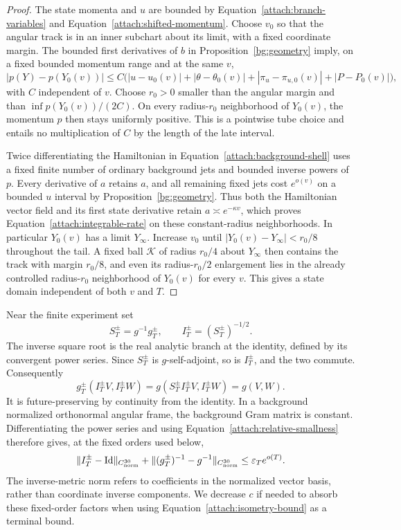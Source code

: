 \begin{proof}
The state momenta and $u$ are bounded by
Equation~\eqref{attach:branch-variables} and
Equation~\eqref{attach:shifted-momentum}. Choose $v_0$ so that the
angular track is in an inner subchart about its limit, with a fixed
coordinate margin. The bounded first derivatives of $b$ in
Proposition~\ref{bg:geometry} imply, on a fixed bounded momentum
range and at the same $v$,
\[
 |p(Y)-p(Y_0(v))|
 \le C\bigl(|u-u_0(v)|+|\theta-\theta_0(v)|
              +|\pi_u-\pi_{u,0}(v)|+|P-P_0(v)|\bigr),
\]
with $C$ independent of $v$. Choose $r_0>0$ smaller than the angular
margin and than $\inf p(Y_0(v))/(2C)$. On every radius-$r_0$
neighborhood of $Y_0(v)$, the momentum $p$ then stays uniformly positive.
This is a pointwise tube choice and entails no multiplication of
$C$ by the length of the late interval.

Twice differentiating the Hamiltonian in
Equation~\eqref{attach:background-shell} uses a fixed finite number
of ordinary background jets and bounded inverse powers of $p$.
Every derivative of $a$ retains $a$, and all remaining fixed jets
cost $e^{o(v)}$ on a bounded $u$ interval by
Proposition~\ref{bg:geometry}. Thus both the Hamiltonian vector field
and its first state derivative retain $a\asymp e^{-\kappa v}$,
which proves Equation~\eqref{attach:integrable-rate} on these
constant-radius neighborhoods. In particular $Y_0(v)$ has a limit
$Y_\infty$. Increase $v_0$ until $|Y_0(v)-Y_\infty|<r_0/8$
throughout the tail. A fixed ball $\mathcal K$ of radius $r_0/4$
about $Y_\infty$ then contains the track with margin $r_0/8$,
and even its radius-$r_0/2$ enlargement lies in the already
controlled radius-$r_0$ neighborhood of $Y_0(v)$ for every $v$.
This gives a state domain independent of both $v$ and $T$.
\end{proof}

Near the finite experiment set
\begin{equation}\label{attach:isometry}
 S_T^\pm=g^{-1}g_T^\pm,
 \qquad I_T^\pm=(S_T^\pm)^{-1/2}.
\end{equation}
The inverse square root is the real analytic branch at the identity,
defined by its convergent power series. Since $S_T^\pm$ is
$g$-self-adjoint, so is $I_T^\pm$, and the two commute. Consequently
\[
 g_T^\pm(I_T^\pm V,I_T^\pm W)
 =g(S_T^\pm I_T^\pm V,I_T^\pm W)=g(V,W).
\]
It is future-preserving by continuity from the identity. In a
background normalized orthonormal angular frame, the background
Gram matrix is constant. Differentiating the power series and using
Equation~\eqref{attach:relative-smallness} therefore gives, at the
fixed orders used below,
\begin{equation}\label{attach:isometry-bound}
 \lVert I_T^\pm-\operatorname{Id}\rVert_{C^{30}_{\mathrm{norm}}}
 +\lVert (g_T^\pm)^{-1}-g^{-1}\rVert_{C^{30}_{\mathrm{norm}}}
 \le \varepsilon_T e^{o(T)}.
\end{equation}
The inverse-metric norm refers to coefficients in the normalized
vector basis, rather than coordinate inverse components. We decrease
$c$ if needed to absorb these fixed-order factors when using
Equation~\eqref{attach:isometry-bound} as a terminal bound.

